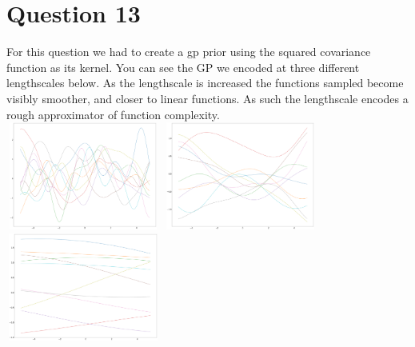 \documentclass[a4paper, 9pt]{article}
\begin{document}
\section*{Question 13}
For this question we had to create a gp prior using the squared covariance function as its kernel. You can see the GP we encoded at three different lengthscales below. As the lengthscale is increased the functions sampled become visibly smoother, and closer to linear functions. As such the lengthscale encodes a rough approximator of function complexity.\\
\newline
\includegraphics[width=2in,height=1.4in]{lines1}
\includegraphics[width=2in,height=1.4in]{lines2}
\includegraphics[width=2in,height=1.4in]{lines3} \\
\end{document}
